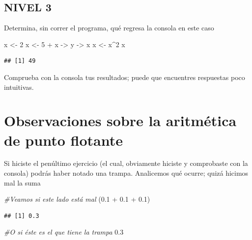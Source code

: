 \documentclass[]{tufte-book}
\newenvironment{Shaded}{}{}
\newcommand{\CommentTok}[1]{\textcolor[rgb]{0.38,0.63,0.69}{\textit{#1}}}
\newcommand{\DecValTok}[1]{\textcolor[rgb]{0.25,0.63,0.44}{#1}}
\newcommand{\FloatTok}[1]{\textcolor[rgb]{0.25,0.63,0.44}{#1}}
\newcommand{\NormalTok}[1]{#1}
\newcommand{\OtherTok}[1]{\textcolor[rgb]{0.00,0.44,0.13}{#1}}
\newcommand{\SpecialCharTok}[1]{\textcolor[rgb]{0.25,0.44,0.63}{#1}}
\begin{document}
\hypertarget{nivel-3}{%
\subsection{NIVEL 3}\label{nivel-3}}

Determina, sin correr el programa, qué regresa la consola en este caso

\begin{Shaded}
\begin{Highlighting}[]
\NormalTok{x }\OtherTok{\textless{}{-}} \DecValTok{2} 
\NormalTok{x }\OtherTok{\textless{}{-}} \DecValTok{5} \SpecialCharTok{+}\NormalTok{ x }\OtherTok{{-}\textgreater{}}\NormalTok{ y }\OtherTok{{-}\textgreater{}}\NormalTok{ x}
\NormalTok{x }\OtherTok{\textless{}{-}}\NormalTok{ x}\SpecialCharTok{\^{}}\DecValTok{2}
\NormalTok{x}
\end{Highlighting}
\end{Shaded}

\begin{verbatim}
## [1] 49
\end{verbatim}

Comprueba con la consola tus resultados; puede que encuentres respuestas
poco intuitivas.

\hypertarget{observaciones-sobre-la-aritmuxe9tica-de-punto-flotante}{%
\section{Observaciones sobre la aritmética de punto
flotante}\label{observaciones-sobre-la-aritmuxe9tica-de-punto-flotante}}

Si hiciste el penúltimo ejercicio (el cual, obviamente hiciste y
comprobaste con la consola) podrás haber notado una trampa. Analicemos
qué ocurre; quizá hicimos mal la suma

\begin{Shaded}
\begin{Highlighting}[]
\CommentTok{\#Veamos si este lado está mal}
\NormalTok{(}\FloatTok{0.1} \SpecialCharTok{+} \FloatTok{0.1} \SpecialCharTok{+} \FloatTok{0.1}\NormalTok{)}
\end{Highlighting}
\end{Shaded}

\begin{verbatim}
## [1] 0.3
\end{verbatim}

\begin{Shaded}
\begin{Highlighting}[]
\CommentTok{\#O si éste es el que tiene la trampa}
\FloatTok{0.3}
\end{Highlighting}
\end{Shaded}
\end{document}
